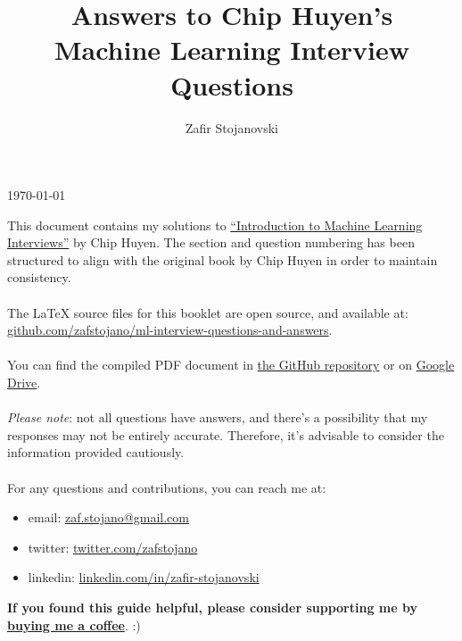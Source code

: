 \documentclass{article}
\title{\Huge Answers to Chip Huyen's \\ Machine Learning Interview Questions}
\author{\Large Zafir Stojanovski}
\date{}
\begin{document}
\maketitle

\thispagestyle{empty} %

\vfill %
\begin{center}
\today
\end{center}

\newpage
\tableofcontents

\setcounter{section}{4}
\newpage

\noindent This document contains my solutions to \href{https://huyenchip.com/ml-interviews-book/}{``Introduction to Machine Learning Interviews''} by Chip Huyen. The section and question numbering has been structured to align with the original book by Chip Huyen in order to maintain consistency.
\\
\\
The \LaTeX \hspace{0.07em} source files for this booklet are open source, and available at: \\ \href{https://github.com/zafstojano/ml-interview-questions-and-answers}{github.com/zafstojano/ml-interview-questions-and-answers}. 
\\
\\
You can find the compiled PDF document in \href{https://github.com/zafstojano/ml-interview-questions-and-answers/blob/main/ML_interview_questions_and_answers.pdf}{the GitHub repository} or on \href{https://drive.google.com/file/d/1P4w12EvvFG19f4uVsvai6fC93p7kRphE/view}{Google Drive}.
\\
\\
\textit{Please note}: not all questions have answers, and there's a possibility that my responses may not be entirely accurate. Therefore, it's advisable to consider the information provided cautiously.
\\
\\
For any questions and contributions, you can reach me at:
\begin{itemize}
    \item email: \href{mailto:zaf.stojano@gmail.com}{zaf.stojano@gmail.com}
    \item twitter: \href{https://twitter.com/zafstojano}{twitter.com/zafstojano}
    \item linkedin: \href{https://www.linkedin.com/in/zafir-stojanovski/}{linkedin.com/in/zafir-stojanovski}
\end{itemize}
\vspace{2em}
\noindent \textbf{If you found this guide helpful, please consider supporting me by \href{https://www.buymeacoffee.com/starzmustdie}{buying me a coffee}}. :) 
\end{document}

